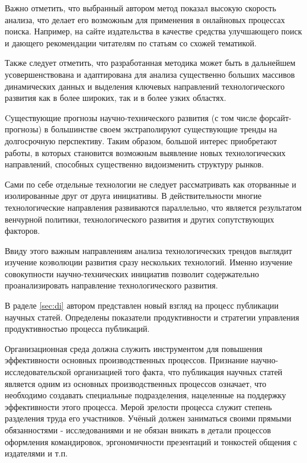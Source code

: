 Важно отметить, что выбранный автором метод показал высокую скорость анализа, что делает его возможным для применения в онлайновых процессах поиска. Например, на сайте издательства в качестве средства улучшающего поиск и дающего рекомендации читателям по статьям со схожей тематикой. 

Также следует отметить, что разработанная методика может быть в дальнейшем усовершенствована и адаптирована для анализа существенно больших массивов динамических данных и выделения ключевых направлений технологического развития как в более широких, так и в более узких областях. 

Cуществующие прогнозы научно-технического развития (с том числе форсайт-прогнозы) в большинстве своем экстраполируют существующие тренды на долгосрочную перспективу. Таким образом, большой интерес приобретают работы, в которых становится возможным выявление новых технологических направлений, способных существенно видоизменить структуру рынков.

Сами по себе отдельные технологии не следует рассматривать как оторванные и изолированные друг от друга инициативы. В действительности многие технологические направления развиваются параллельно, что является результатом венчурной политики, технологического развития и других сопутствующих факторов. 

Ввиду этого важным направлениям анализа технологических трендов выглядит изучение коэволюции развития сразу нескольких технологий. Именно изучение совокупности научно-технических инициатив позволит содержательно проанализировать направление технологического развития.


В раделе \ref{sec:di} автором представлен новый взгляд на процесс публикации научных статей. Определены показатели продуктивности и стратегии управления продуктивностью процесса публикаций.
 
Организационная среда должна служить инструментом для повышения эффективности основных производственных процессов. Признание научно-исследовательской организацией того факта, что публикация научных статей является одним из основных производственных процессов означает, что необходимо создавать специальные подразделения, нацеленные на поддержку эффективности этого процесса. Мерой зрелости процесса служит степень разделения труда его участников. Учёный должен заниматься своими прямыми обязанностями - исследованиями и не обязан вникать в детали процессов оформления командировок, эргономичности презентаций и тонкостей общения с издателями и т.п.

